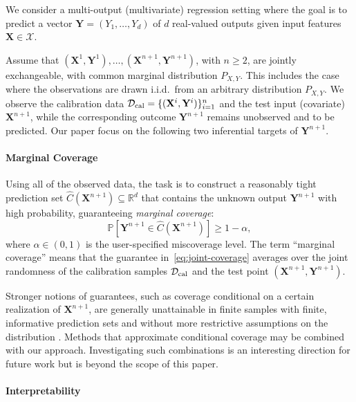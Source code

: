 We consider a multi-output (multivariate) regression setting where the goal is to predict a vector $\mathbf Y=(Y_1,\ldots,Y_d)$ of $d$ real-valued outputs given input features $\mathbf X\in\mathcal X$.

Assume that $(\mathbf X^1,\mathbf Y^1),\ldots,(\mathbf X^{n+1},\mathbf Y^{n+1})$, with $n\geq2$, are jointly exchangeable, with common marginal distribution $P_{X,Y}$. This includes the case where the observations are drawn i.i.d.\ from an arbitrary distribution $P_{X,Y}$. We observe the calibration data ${\cal D}_{\mathrm{cal}}=\{(\mathbf X^i,\mathbf Y^i)\}_{i=1}^n$ and the test input (covariate) $\mathbf X^{n+1}$, while the corresponding outcome $\mathbf Y^{n+1}$ remains unobserved and to be predicted. Our paper focus on the following two inferential targets of $\mathbf Y^{n+1}$.

\paragraph{Marginal Coverage}

Using all of the observed data, the task is to construct a reasonably tight prediction set $\hat C(\mathbf X^{n+1})\subseteq\mathbb R^d$ that contains the unknown output $\mathbf Y^{n+1}$ with high probability, guaranteeing \emph{marginal coverage}:
\begin{equation}
\mathbb P\!\left[\mathbf Y^{n+1}\in\hat C(\mathbf X^{n+1})\right]\geq1-\alpha,
\label{eq:joint-coverage}
\end{equation}
where $\alpha\in(0,1)$ is the user-specified miscoverage level.
The term ``marginal coverage'' means that the guarantee in~\eqref{eq:joint-coverage} averages over the joint randomness of the calibration samples ${\cal D}_{\mathrm{cal}}$ and the test point $(\mathbf X^{n+1},\mathbf Y^{n+1})$.

Stronger notions of guarantees, such as coverage conditional on a certain realization of $\mathbf X^{n+1}$, are generally unattainable in finite samples with finite, informative prediction sets and without more restrictive assumptions on the distribution \citep{foygel2021limits}. Methods that approximate conditional coverage \citep{Romano2020With,gibbs2025conformal} may be combined with our approach. Investigating such combinations is an interesting direction for future work but is beyond the scope of this paper.

\paragraph{Interpretability}

